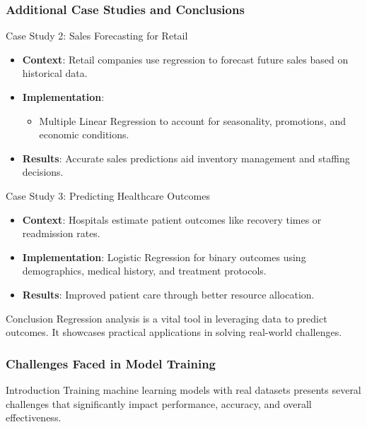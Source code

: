 \documentclass[aspectratio=169]{beamer}
\begin{document}
\begin{frame}[fragile]
    \frametitle{Additional Case Studies and Conclusions}
    \begin{block}{Case Study 2: Sales Forecasting for Retail}
        \begin{itemize}
            \item \textbf{Context}: Retail companies use regression to forecast future sales based on historical data.
            \item \textbf{Implementation}:
            \begin{itemize}
                \item Multiple Linear Regression to account for seasonality, promotions, and economic conditions.
            \end{itemize}
            \item \textbf{Results}: Accurate sales predictions aid inventory management and staffing decisions.
        \end{itemize}
    \end{block}

    \begin{block}{Case Study 3: Predicting Healthcare Outcomes}
        \begin{itemize}
            \item \textbf{Context}: Hospitals estimate patient outcomes like recovery times or readmission rates.
            \item \textbf{Implementation}: Logistic Regression for binary outcomes using demographics, medical history, and treatment protocols.
            \item \textbf{Results}: Improved patient care through better resource allocation.
        \end{itemize}
    \end{block}

    \begin{block}{Conclusion}
        Regression analysis is a vital tool in leveraging data to predict outcomes. It showcases practical applications in solving real-world challenges.
    \end{block}
\end{frame}

\begin{frame}[fragile]
    \frametitle{Challenges Faced in Model Training}
    \begin{block}{Introduction}
        Training machine learning models with real datasets presents several challenges that significantly impact performance, accuracy, and overall effectiveness.
    \end{block}
\end{frame}
\end{document}
